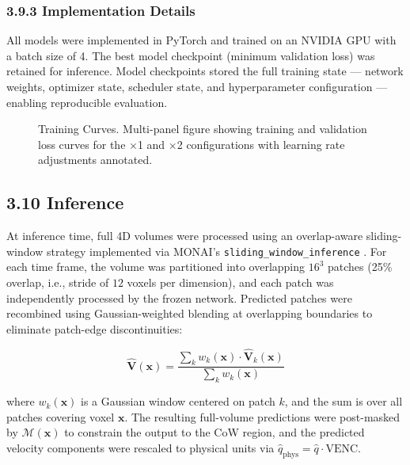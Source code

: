 \documentclass[11pt]{article}
\begin{document}
\subsubsection*{3.9.3 Implementation Details}

All models were implemented in PyTorch and trained on an NVIDIA GPU with a batch size of 4. The best model checkpoint (minimum validation loss) was retained for inference. Model checkpoints stored the full training state --- network weights, optimizer state, scheduler state, and hyperparameter configuration --- enabling reproducible evaluation.

\begin{figure}[!htbp]
    \centering
    \caption{Training Curves. Multi-panel figure showing training and validation loss curves for the $\times$1 and $\times$2 configurations with learning rate adjustments annotated.}
    \label{fig:training}
\end{figure}

\subsection*{3.10 Inference}

At inference time, full 4D volumes were processed using an overlap-aware sliding-window strategy implemented via MONAI's \texttt{sliding\_window\_inference} \cite{cardoso2022monai,ronneberger2015unet}. For each time frame, the volume was partitioned into overlapping $16^3$ patches (25\% overlap, i.e., stride of $12$ voxels per dimension), and each patch was independently processed by the frozen network. Predicted patches were recombined using Gaussian-weighted blending at overlapping boundaries to eliminate patch-edge discontinuities:

\begin{equation}
    \hat{\mathbf{V}}(\mathbf{x}) = \frac{\sum_k w_k(\mathbf{x}) \cdot \hat{\mathbf{V}}_k(\mathbf{x})}{\sum_k w_k(\mathbf{x})}
\end{equation}

where $w_k(\mathbf{x})$ is a Gaussian window centered on patch $k$, and the sum is over all patches covering voxel $\mathbf{x}$. The resulting full-volume predictions were post-masked by $\mathcal{M}(\mathbf{x})$ to constrain the output to the CoW region, and the predicted velocity components were rescaled to physical units via $\hat{q}_{\text{phys}} = \hat{q} \cdot \text{VENC}$.
\end{document}

